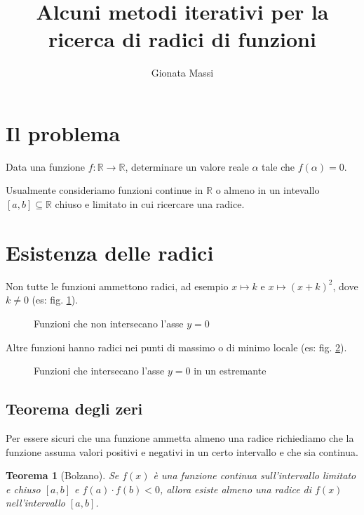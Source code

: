 \documentclass[12pt]{article}
\title{Alcuni metodi iterativi per la ricerca di radici di funzioni}
\author{Gionata Massi}
\date{} %
\theoremstyle{plain}%
\newtheorem{thm}{Teorema}[section]
\theoremstyle{definition}
\theoremstyle{remark}
\begin{document}
\maketitle

\thispagestyle{empty}%

\tableofcontents

\section{Il problema}

Data una funzione $f : \mathbb{R} \to \mathbb{R}$, determinare un valore reale $\alpha$ tale che $f(\alpha) = 0$.

Usualmente consideriamo funzioni continue in $\mathbb{R}$ o almeno in un intevallo $[a, b] \subseteq \mathbb{R}$ chiuso e limitato in cui ricercare una radice.

\section{Esistenza delle radici}

Non tutte le funzioni ammettono radici, ad esempio $x \mapsto k$ e $x \mapsto (x + k)^2$, dove $k \neq 0$ (es: fig. \ref{fig:no_zeri}).

\begin{figure}[ht]
    \centering
    
    \caption{Funzioni che non intersecano l'asse $y = 0$}
    \label{fig:no_zeri}
\end{figure}
    
Altre funzioni hanno radici nei punti di massimo o di minimo locale (es: fig. \ref{fig:zero_estremante}).

\begin{figure}[ht]
    \centering
    
    \caption{Funzioni che intersecano l'asse $y = 0$ in un estremante}
    \label{fig:zero_estremante}
\end{figure}

\subsection{Teorema degli zeri}

Per essere sicuri che una funzione ammetta almeno una radice richiediamo che la funzione assuma valori positivi e negativi in un certo intervallo e che sia continua.

\begin{thm}[Bolzano]
Se $f (x)$ è una funzione continua sull'intervallo limitato e chiuso $[a, b]$ e $f (a) \cdot f (b) < 0$, allora esiste almeno una radice di $f (x)$ nell'intervallo $[a, b]$.
\end{thm}
\end{document}
